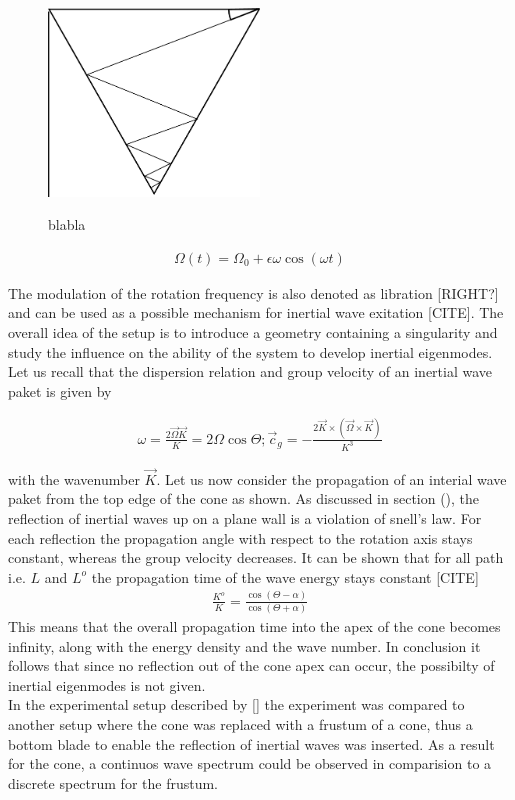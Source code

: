 \begin{figure}[!tbp]
  \centering
  \includegraphics[width=0.5\textwidth]{gfx/cone/cone.pdf}\label{fig:cone_cone}
  \caption{blabla}
\end{figure}

\begin{align}
\Omega(t) = \Omega_0 + \epsilon \omega \cos(\omega t)
\end{align}

The modulation of the rotation frequency is also denoted as libration [RIGHT?] and can be used as a possible mechanism
for inertial wave exitation [CITE].
The overall idea of the setup is to introduce a geometry containing a singularity and study the influence on the ability of
the system to develop inertial eigenmodes.
Let us recall that the dispersion relation and group velocity of an inertial wave paket is given by

\begin{align}
    \omega = \frac{2\vec{\Omega}\vec{K}}{K} = 2 \Omega \cos\Theta ; \vec{c}_g = -\frac{2\vec{K}\times (\vec{\Omega} \times \vec{K})}{K^3}
\end{align}

with the wavenumber $\vec{K}$.
Let us now consider the propagation of an interial wave paket from the top edge of the cone as shown.
As discussed in section (), the reflection of inertial waves up on a  plane wall is a violation of snell's law.
For each reflection the propagation angle with respect to the rotation axis stays constant,
whereas the group velocity decreases.
It can be shown that for all path i.e. $L$ and $L^o$ the propagation time of the wave energy stays constant [CITE]
\begin{align}
    \frac{K^o}{K} = \frac{\cos(\Theta - \alpha)}{\cos(\Theta + \alpha)}
\end{align}
This means that the overall propagation time into the apex of the cone becomes infinity, along with the energy density and the wave number.
In conclusion it follows that since no reflection out of the cone apex can occur, the possibilty of inertial eigenmodes is not given.\\
In the experimental setup described by [] the experiment was compared to another setup where the cone was replaced with a frustum of a cone,
thus a bottom blade to enable the reflection of inertial waves was inserted.
As a result for the cone, a continuos wave spectrum could be observed in comparision to a discrete spectrum  for the frustum.\\

